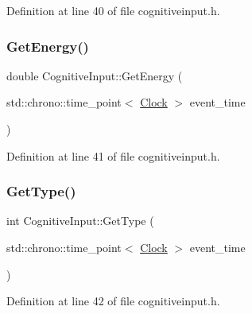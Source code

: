 Definition at line 40 of file cognitiveinput.\+h.

\mbox{\label{class_cognitive_input_a9bdb43198c1a36b97a6da125331bc927}} 
\subsubsection{\texorpdfstring{Get\+Energy()}{GetEnergy()}}
{\footnotesize\ttfamily double Cognitive\+Input\+::\+Get\+Energy (\begin{DoxyParamCaption}\item[{std\+::chrono\+::time\+\_\+point$<$ \hyperlink{universe_8h_a0ef8d951d1ca5ab3cfaf7ab4c7a6fd80}{Clock} $>$}]{event\+\_\+time }\end{DoxyParamCaption})\hspace{0.3cm}{\ttfamily [inline]}}



Definition at line 41 of file cognitiveinput.\+h.

\mbox{\label{class_cognitive_input_a0ad0919c7280b268493b27892bd7c784}} 
\subsubsection{\texorpdfstring{Get\+Type()}{GetType()}}
{\footnotesize\ttfamily int Cognitive\+Input\+::\+Get\+Type (\begin{DoxyParamCaption}\item[{std\+::chrono\+::time\+\_\+point$<$ \hyperlink{universe_8h_a0ef8d951d1ca5ab3cfaf7ab4c7a6fd80}{Clock} $>$}]{event\+\_\+time }\end{DoxyParamCaption})\hspace{0.3cm}{\ttfamily [inline]}}



Definition at line 42 of file cognitiveinput.\+h.

\mbox{\label{class_cognitive_input_a943605b820cc279533e19d24e11405c6}} 
